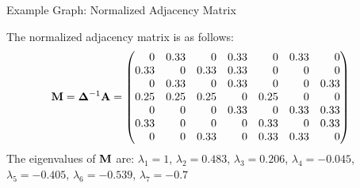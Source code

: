 \begin{frame}{Example Graph: Normalized Adjacency Matrix}
\begin{figure}
    \centerline{
	}
		\vspace{-0.2in}
 \end{figure}
 \small
    The normalized adjacency matrix is as follows:
    \begin{align*}
        \bM & = \bDelta^{-1}\bA =
        \amatr{r}{
        0& 0.33& 0& 0.33& 0& 0.33& 0\\
        0.33& 0& 0.33& 0.33& 0& 0& 0\\
        0& 0.33& 0& 0.33& 0& 0& 0.33\\
        0.25& 0.25& 0.25& 0& 0.25& 0& 0\\
        0& 0& 0& 0.33& 0& 0.33& 0.33\\
        0.33& 0& 0& 0& 0.33& 0& 0.33\\
        0& 0& 0.33& 0& 0.33& 0.33& 0\\
        }
    \end{align*}
    The eigenvalues of $\mathbf{M}$ are:
    $\lambda_1   = 1 $,
    $\lambda_2  =0.483 $,
    $\lambda_3  =0.206$,
    $\lambda_4  = -0.045$,
    $\lambda_5  =-0.405 $,
    $\lambda_6  = -0.539 $,
    $\lambda_7 =-0.7$
  \end{frame}



